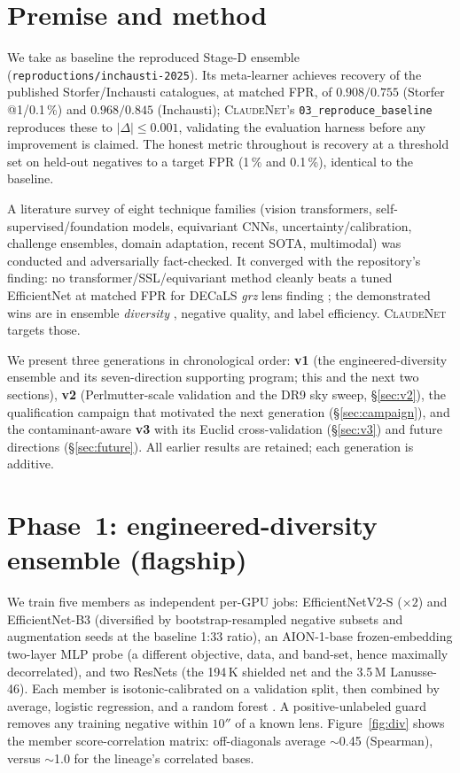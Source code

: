 \documentclass[11pt,letterpaper]{article}
\newcommand{\cnet}{\textsc{ClaudeNet}}
\newcommand{\aion}{\textsc{AION-1}}
\begin{document}
\section{Premise and method}
We take as baseline the reproduced Stage-D \citet{inchausti2025} ensemble
(\texttt{reproductions/inchausti-2025}). Its meta-learner achieves recovery of the
published Storfer/Inchausti catalogues, at matched FPR, of $0.908/0.755$ (Storfer
@1/0.1\,\%) and $0.968/0.845$ (Inchausti); \cnet{}'s
\texttt{03\_reproduce\_baseline} reproduces these to $|\Delta|\le0.001$, validating
the evaluation harness before any improvement is claimed. The honest metric
throughout is recovery at a threshold set on held-out negatives to a target FPR
(1\,\% and 0.1\,\%), identical to the baseline.

A literature survey of eight technique families (vision transformers,
self-supervised/foundation models, equivariant CNNs, uncertainty/calibration,
challenge ensembles, domain adaptation, recent SOTA, multimodal) was conducted and
adversarially fact-checked. It converged with the repository's finding: no
transformer/SSL/equivariant method cleanly beats a tuned EfficientNet at matched
FPR for DECaLS \emph{grz} lens finding \citep{parlange2025gravit}; the demonstrated
wins are in ensemble \emph{diversity} \citep{des2025ensemble,rezaei2025kids},
negative quality, and label efficiency. \cnet{} targets those.

We present three generations in chronological order: \textbf{v1} (the engineered-diversity ensemble
and its seven-direction supporting program; this and the next two sections), \textbf{v2}
(Perlmutter-scale validation and the DR9 sky sweep, \S\ref{sec:v2}), the qualification campaign that
motivated the next generation (\S\ref{sec:campaign}), and the contaminant-aware \textbf{v3} with its
Euclid cross-validation (\S\ref{sec:v3}) and future directions (\S\ref{sec:future}). All earlier
results are retained; each generation is additive.

\section{Phase~1: engineered-diversity ensemble (flagship)}
We train five members as independent per-GPU jobs: EfficientNetV2-S ($\times2$) and
EfficientNet-B3 (diversified by bootstrap-resampled negative subsets and
augmentation seeds at the baseline 1:33 ratio), an \aion{}-base frozen-embedding
two-layer MLP probe (a different objective, data, and band-set, hence maximally
decorrelated), and two ResNets (the 194\,K shielded net and the 3.5\,M Lanusse-46).
Each member is isotonic-calibrated on a validation split, then combined by
average, logistic regression, and a random forest \citep{coscrato2020nnstacking}.
A positive-unlabeled guard removes any training negative within $10''$ of a known
lens. Figure~\ref{fig:div} shows the member score-correlation matrix:
off-diagonals average $\sim$0.45 (Spearman), versus $\sim$1.0 for the lineage's
correlated bases.
\end{document}
